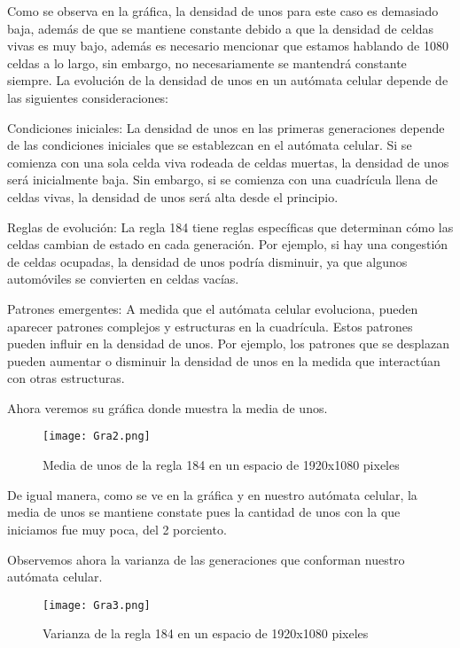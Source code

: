 \documentclass{article}
\begin{document}
\begin{itemize}
		Como se observa en la gráfica, la densidad de unos para este caso es demasiado baja, además de que se mantiene constante debido a que la densidad de celdas vivas es muy bajo, además es necesario mencionar que estamos hablando de 1080 celdas a lo largo, sin embargo, no necesariamente se mantendrá constante siempre. La evolución de la densidad de unos en un autómata celular depende de las siguientes consideraciones:
		
		 Condiciones iniciales: La densidad de unos en las primeras generaciones depende de las condiciones iniciales que se establezcan en el autómata celular. Si se comienza con una sola celda viva rodeada de celdas muertas, la densidad de unos será inicialmente baja. Sin embargo, si se comienza con una cuadrícula llena de celdas vivas, la densidad de unos será alta desde el principio.
		
		 Reglas de evolución: La regla 184 tiene reglas específicas que determinan cómo las celdas cambian de estado en cada generación. Por ejemplo, si hay una congestión de celdas ocupadas, la densidad de unos podría disminuir, ya que algunos automóviles se convierten en celdas vacías.
		
		 Patrones emergentes: A medida que el autómata celular evoluciona, pueden aparecer patrones complejos y estructuras en la cuadrícula. Estos patrones pueden influir en la densidad de unos. Por ejemplo, los patrones que se desplazan pueden aumentar o disminuir la densidad de unos en la medida que interactúan con otras estructuras.
		 
		 Ahora veremos su gráfica donde muestra la media de unos. 
		 
		 \begin{figure}[h]
		 	\centering       
		 	\texttt{[image: Gra2.png]}
		 	\caption{Media de unos de la regla 184 en un espacio de 1920x1080 pixeles}
		 	\label{fig:mi_imagen1}
		 \end{figure}
		
		De igual manera, como se ve en la gráfica y en nuestro autómata celular, la media de unos se mantiene constate pues la cantidad de unos con la que iniciamos fue muy poca, del 2 porciento.
		
		Observemos ahora la varianza de las generaciones que conforman nuestro autómata celular. 
		
		\begin{figure}[h]
			\centering       
			\texttt{[image: Gra3.png]}
			\caption{Varianza de la regla 184 en un espacio de 1920x1080 pixeles}
			\label{fig:mi_imagen1}
		\end{figure}
		

\end{itemize}
\end{document}
